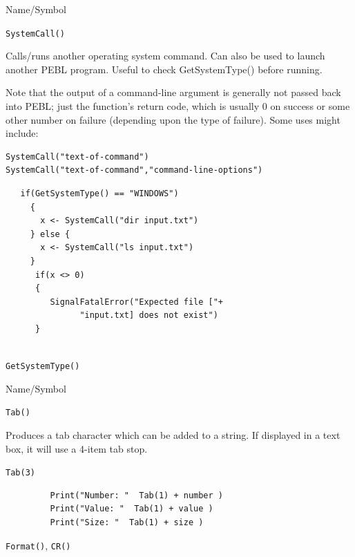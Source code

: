 \begin{desc}{Name/Symbol}
\item[Name/Symbol]  	\verb+SystemCall()+

\item[Description] Calls/runs another operating system command.  Can also be used to 
launch another PEBL program.  Useful to check GetSystemType() before running.

 Note that the output of a
   command-line argument is generally not passed back into PEBL; just
   the function's return code, which is usually 0 on success or some
   other number on failure (depending upon the type of failure).  Some
   uses might include:

\item[Usage]		
\begin{verbatim}
SystemCall("text-of-command")
SystemCall("text-of-command","command-line-options")
\end{verbatim}

\item[Example]	
\begin{verbatim}
   if(GetSystemType() == "WINDOWS")
     {
       x <- SystemCall("dir input.txt") 
     } else {
       x <- SystemCall("ls input.txt") 
     }
      if(x <> 0)
      {
         SignalFatalError("Expected file ["+
               "input.txt] does not exist")
      }


\end{verbatim}

\item[See Also]	
  \verb+GetSystemType()+
\end{desc}

\vfill
\newpage
{}
\vfill



\begin{desc}{Name/Symbol}

\item[Name/Symbol] \verb+Tab()+

\item[Description]  Produces a tab character which can be added to a
  string. If displayed in a text box, it will use a 4-item tab stop.

\item[Usage]        \verb!Tab(3)!


\item[Example]     
\begin{verbatim}
         Print("Number: "  Tab(1) + number )
         Print("Value: "  Tab(1) + value )
         Print("Size: "  Tab(1) + size )
\end{verbatim}
\item[See Also]
\verb+Format()+, \verb+CR()+
\end{desc}



